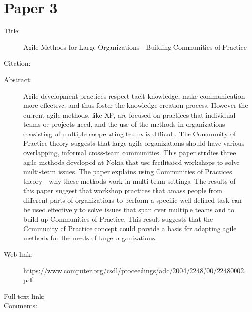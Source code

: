 \documentclass{scrartcl}
\begin{document}
\section*{Paper 3}
\begin{description}
\item[Title:] Agile Methods for Large Organizations - Building Communities of Practice
\item[Citation:] \cite{bibtex_key}
\item[Abstract:] Agile development practices respect tacit knowledge, make communication more effective, and thus foster the knowledge creation process. However the current agile methods, like XP, are focused on practices that individual teams or projects need, and the use of the methods in organizations consisting of multiple cooperating teams is difficult. The Community of Practice theory suggests that large agile organizations should have various overlapping, informal cross-team communities. This paper studies three agile methods developed at Nokia that use facilitated workshops to solve multi-team issues. The paper explains using Communities of Practices theory - why these methods work in multi-team settings. The results of this paper suggest that workshop practices that amass people from different parts of organizations to perform a specific well-defined task can be used effectively to solve issues that span over multiple teams and to build up Communities of Practice. This result suggests that the Community of Practice concept could provide a basis for adapting agile methods for the needs of large organizations.
\item[Web link:] https://www.computer.org/csdl/proceedings/adc/2004/2248/00/22480002.pdf
\item[Full text link:] 
\item[Comments:] 
\end{description}
\end{document}
